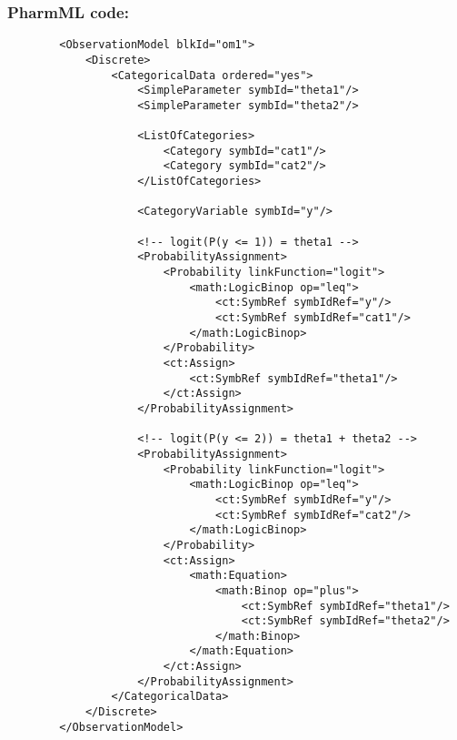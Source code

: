 \myEndLine

\subsubsection{PharmML code:}

\lstset{language=XML}
\begin{lstlisting}
        <ObservationModel blkId="om1">
            <Discrete>
                <CategoricalData ordered="yes">
                    <SimpleParameter symbId="theta1"/>
                    <SimpleParameter symbId="theta2"/>
                    
                    <ListOfCategories> 
                        <Category symbId="cat1"/>
                        <Category symbId="cat2"/>
                    </ListOfCategories>
                    
                    <CategoryVariable symbId="y"/>
                    
                    <!-- logit(P(y <= 1)) = theta1 -->
                    <ProbabilityAssignment>
                        <Probability linkFunction="logit">
                            <math:LogicBinop op="leq">
                                <ct:SymbRef symbIdRef="y"/>
                                <ct:SymbRef symbIdRef="cat1"/>
                            </math:LogicBinop>
                        </Probability>
                        <ct:Assign>
                            <ct:SymbRef symbIdRef="theta1"/>
                        </ct:Assign>
                    </ProbabilityAssignment>
                    
                    <!-- logit(P(y <= 2)) = theta1 + theta2 -->
                    <ProbabilityAssignment>
                        <Probability linkFunction="logit">
                            <math:LogicBinop op="leq">
                                <ct:SymbRef symbIdRef="y"/>
                                <ct:SymbRef symbIdRef="cat2"/>
                            </math:LogicBinop>
                        </Probability>
                        <ct:Assign>
                            <math:Equation>
                                <math:Binop op="plus">
                                    <ct:SymbRef symbIdRef="theta1"/>
                                    <ct:SymbRef symbIdRef="theta2"/>
                                </math:Binop>
                            </math:Equation>
                        </ct:Assign>
                    </ProbabilityAssignment>
                </CategoricalData>
            </Discrete>
        </ObservationModel>
 \end{lstlisting}



